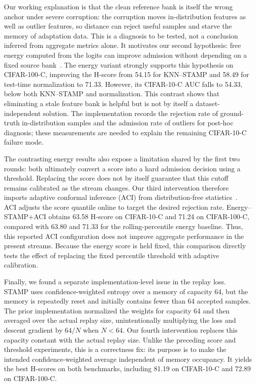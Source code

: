 Our working explanation is that the clean reference bank is itself the wrong
anchor under severe corruption: the corruption moves in-distribution features
as well as outlier features, so distance can reject useful samples and starve
the memory of adaptation data. This is a diagnosis to be tested, not a
conclusion inferred from aggregate metrics alone. It motivates our second
hypothesis: free energy computed from the logits can improve admission without
depending on a fixed source bank~\cite{liu2020energy}. The energy variant
strongly supports this hypothesis on CIFAR-100-C, improving the H-score from
54.15 for KNN--STAMP and 58.49 for test-time normalization to 71.33. However,
its CIFAR-10-C AUC falls to 54.33, below both KNN--STAMP and normalization.
This contrast shows that eliminating a stale feature bank is helpful but is not
by itself a dataset-independent solution. The implementation records the
rejection rate of ground-truth in-distribution samples and the admission rate
of outliers for post-hoc diagnosis; these measurements are needed to explain
the remaining CIFAR-10-C failure mode.

The contrasting energy results also expose a limitation shared by the first two
rounds: both ultimately convert a score into a hard admission decision using a
threshold. Replacing the score does not by itself guarantee that this cutoff
remains calibrated as the stream changes. Our third intervention therefore
imports adaptive conformal inference (ACI) from distribution-free
statistics~\cite{gibbs2021aci}. ACI adjusts the score quantile online to target
the desired rejection rate. Energy--STAMP+ACI obtains 63.58 H-score on
CIFAR-10-C and 71.24 on CIFAR-100-C, compared with 63.80 and 71.33 for the
rolling-percentile energy baseline. Thus, this reported ACI configuration does
not improve aggregate performance in the present streams. Because the energy
score is held fixed, this comparison directly tests the effect of replacing the
fixed percentile threshold with adaptive calibration.

Finally, we found a separate implementation-level issue in the replay loss.
STAMP uses confidence-weighted entropy over a memory of capacity 64, but the
memory is repeatedly reset and initially contains fewer than 64 accepted
samples. The prior implementation normalized the weights for capacity 64 and
then averaged over the actual replay size, unintentionally multiplying the loss
and descent gradient by $64/N$ when $N<64$. Our fourth intervention replaces
this capacity constant with the actual replay size. Unlike the preceding score
and threshold experiments, this is a correctness fix: its purpose is to make
the intended confidence-weighted average independent of memory occupancy.
It yields the best H-scores on both benchmarks, including 81.19 on
CIFAR-10-C and 72.89 on CIFAR-100-C.

